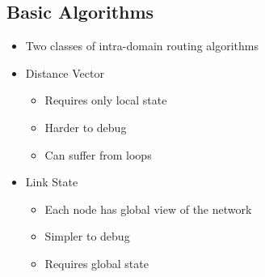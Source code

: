 \subsection{Basic Algorithms}
\begin{itemize}[nosep]
    \item Two classes of intra-domain routing algorithms
    \item Distance Vector
          \begin{itemize}[nosep]
              \item Requires only local state
              \item Harder to debug
              \item Can suffer from loops
          \end{itemize}
    \item Link State
          \begin{itemize}[nosep]
              \item Each node has global view of the network
              \item Simpler to debug
              \item Requires global state
          \end{itemize}
\end{itemize}
